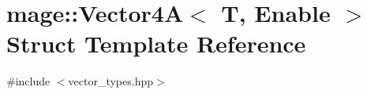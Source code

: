 \hypertarget{structmage_1_1_vector4_a}{}\section{mage\+:\+:Vector4A$<$ T, Enable $>$ Struct Template Reference}
\label{structmage_1_1_vector4_a}


{\ttfamily \#include $<$vector\+\_\+types.\+hpp$>$}

